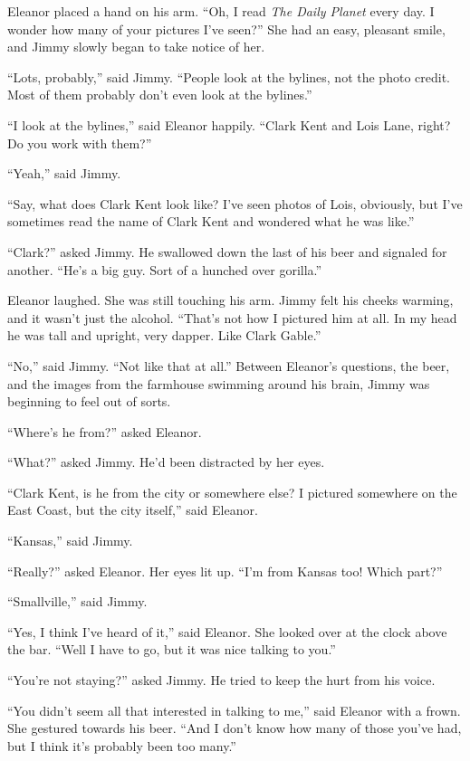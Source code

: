 \documentclass[ebook,12pt]{memoir}
\begin{document}
Eleanor placed a hand on his arm. ``Oh, I read \emph{The Daily Planet}
every day. I wonder how many of your pictures I've seen?'' She had an
easy, pleasant smile, and Jimmy slowly began to take notice of her.

``Lots, probably,'' said Jimmy. ``People look at the bylines, not the
photo credit. Most of them probably don't even look at the bylines.''

``I look at the bylines,'' said Eleanor happily. ``Clark Kent and Lois
Lane, right? Do you work with them?''

``Yeah,'' said Jimmy.

``Say, what does Clark Kent look like? I've seen photos of Lois,
obviously, but I've sometimes read the name of Clark Kent and wondered
what he was like.''

``Clark?'' asked Jimmy. He swallowed down the last of his beer and
signaled for another. ``He's a big guy. Sort of a hunched over
gorilla.''

Eleanor laughed. She was still touching his arm. Jimmy felt his cheeks
warming, and it wasn't just the alcohol. ``That's not how I pictured him
at all. In my head he was tall and upright, very dapper. Like Clark
Gable.''

``No,'' said Jimmy. ``Not like that at all.'' Between Eleanor's
questions, the beer, and the images from the farmhouse swimming around
his brain, Jimmy was beginning to feel out of sorts.

``Where's he from?'' asked Eleanor.

``What?'' asked Jimmy. He'd been distracted by her eyes.

``Clark Kent, is he from the city or somewhere else? I pictured
somewhere on the East Coast, but the city itself,'' said Eleanor.

``Kansas,'' said Jimmy.

``Really?'' asked Eleanor. Her eyes lit up. ``I'm from Kansas too! Which
part?''

``Smallville,'' said Jimmy.

``Yes, I think I've heard of it,'' said Eleanor. She looked over at the
clock above the bar. ``Well I have to go, but it was nice talking to
you.''

``You're not staying?'' asked Jimmy. He tried to keep the hurt from his
voice.

``You didn't seem all that interested in talking to me,'' said Eleanor
with a frown. She gestured towards his beer. ``And I don't know how many
of those you've had, but I think it's probably been too many.''
\end{document}
